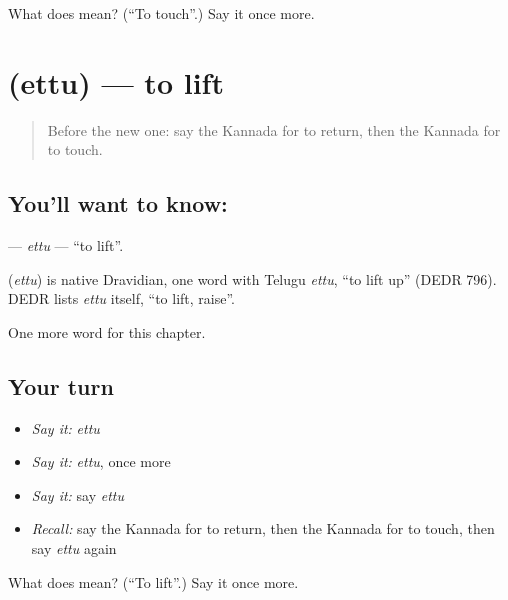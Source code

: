 \begin{tcolorbox}[breakable,colback=teal!4,colframe=teal!35!black,title={Before you move on}]
What does  mean? (\textquotedblleft{}To touch\textquotedblright{}.) Say it once more.
\end{tcolorbox}
\section[\texorpdfstring{\kn{ಎತ್ತು} (ettu)}{ಎತ್ತು (ettu)}]{ (ettu) — to lift}

\label{lesson:KA-C235-ettu}



\begin{quote}
Before the new one: say the Kannada for to return, then the Kannada for to touch.
\end{quote}

\subsection*{You'll want to know: }
\textbf{} — \emph{ettu} — \textquotedblleft{}to lift\textquotedblright{}.

\begin{cousinweb}
\textbf{} (\emph{ettu}) is native Dravidian, one word with Telugu \emph{ettu}, \textquotedblleft{}to lift up\textquotedblright{} (DEDR 796). DEDR lists \emph{ettu} itself, \textquotedblleft{}to lift, raise\textquotedblright{}.
\end{cousinweb}

\begin{grammarlens}[title={What you've built}]
One more word for this chapter.
\end{grammarlens}

\subsection*{Your turn}
\begin{itemize}
\raggedright
  \item \emph{Say it:} \emph{ettu}
  \item \emph{Say it:} \emph{ettu}, once more
  \item \emph{Say it:} say \emph{ettu}
  \item \emph{Recall:} say the Kannada for to return, then the Kannada for to touch, then say \emph{ettu} again
\end{itemize}

\begin{tcolorbox}[breakable,colback=teal!4,colframe=teal!35!black,title={Before you move on}]
What does  mean? (\textquotedblleft{}To lift\textquotedblright{}.) Say it once more.
\end{tcolorbox}
